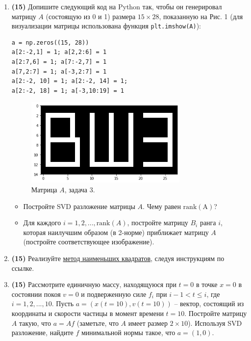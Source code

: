 \documentclass[prb,papersize=a4paper,notitlepage]{revtex4-1}%
\begin{document}
\begin{enumerate}
\item \textbf{(15)} Допишите следующий код на Python так, чтобы он генерировал матрицу $A$ (состоящую из 0 и 1) размера $15\times 28$, показанную на Рис. 1 (для визуализации матрицы использована функция \lstinline{plt.imshow(A)}):
\lstset{language=Python}
\lstset{frame=lines}
\lstset{basicstyle=\ttfamily}
\begin{lstlisting}
a = np.zeros((15, 28))
a[2:-2,1] = 1; a[2,2:6] = 1
a[2:7,6] = 1; a[7:-2,7] = 1
a[7,2:7] = 1; a[-3,2:7] = 1
a[2:-2, 10] = 1; a[2:-2, 14] = 1; 
a[2:-2, 18] = 1; a[-3,10:19] = 1
\end{lstlisting}
\begin{figure}[h!]
\includegraphics[width=8cm]{hse.png}
\caption{Матрица $A$, задача 3.}
\label{subs}
\end{figure}
\begin{itemize}
\item Постройте SVD разложение матрицы $A$. Чему равен $\mathrm{rank(A)}$?
\item Для каждого $i=1,2,...,\mathrm{rank}(A)$, постройте матрицу $B_i$ ранга $i$, которая наилучшим образом (в 2-норме) приближает матрицу $A$ (постройте соответствующее изображение). 
\end{itemize}

\item \textbf{(15)} Реализуйте \href{https://github.com/ev-br/CP2020/blob/master/week_3_lsq.ipynb}{метод наименьших квадратов}, следуя инструкциям по ссылке.

\item \textbf{(15)} 
Рассмотрите единичную массу, находящуюся при $t=0$ в точке $x=0$ в состоянии покоя $v=0$ и подверженную силе $f_i$ при $i-1< t \le i$, где $i=1,2,...,10$. Пусть $a=(x(t=10),v(t=10))$ -- вектор, состоящий из координаты и скорости частицы в момент времени $t=10$. Постройте матрицу $A$ такую, что $a=Af$ (заметьте, что $A$ имеет размер $2\times 10$). Используя SVD разложение, найдите $f$ минимальной нормы такое, что $a=(1,0)$.
\end{enumerate}
\end{document}
